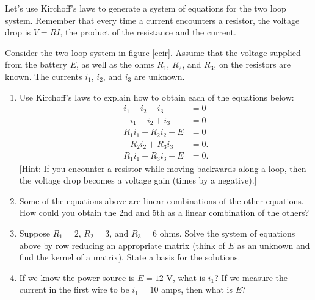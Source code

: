 Let's use Kirchoff's laws to generate a system of equations for the two loop system. Remember that every time a current encounters a resistor, the voltage drop is $V=RI$, the product of the resistance and the current. 
\begin{problem} \label{kirchoff 2 loop general}
Consider the two loop system in figure \ref{ecir}. Assume that the voltage supplied from the battery $E$, as well as the ohms $R_1$, $R_2$, and $R_3$, on the resistors are known. The currents $i_1$, $i_2$, and $i_3$ are unknown.
\begin{enumerate}
 \item Use Kirchoff's laws to explain how to obtain each of the equations below:
$$
\begin{array}{rl}
i_1-i_2-i_3&=0\\
-i_1+i_2+i_3&=0\\
R_1i_1+R_2i_2-E&=0\\
-R_2 i_2 +R_3i_3&=0.\\
R_1i_1 + R_3i_3-E&=0.
\end{array}
$$
[Hint: If you encounter a resistor while moving backwards along a loop, then the voltage drop becomes a voltage gain (times by a negative).]
 \item Some of the equations above are linear combinations of the other equations.  How could you obtain the 2nd and 5th as a linear combination of the others?
 \item Suppose $R_1 = 2$, $R_2 = 3$, and  $R_3 = 6$ ohms.  Solve the system of equations above by row reducing an appropriate matrix (think of $E$ as an unknown and find the kernel of a matrix).  State a basis for the solutions.
 \item If we know the power source is $E=12$ V, what is $i_1$?  If we measure the current in the first wire to be $i_1=10$ amps, then what is $E$?
\end{enumerate}
\end{problem}













